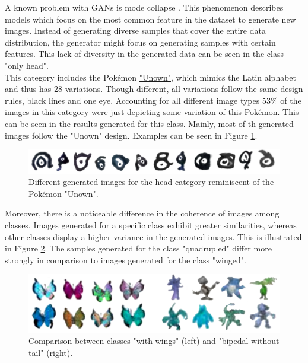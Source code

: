 \documentclass[12pt]{article}
\theoremstyle{plain}
\theoremstyle{definition}
\theoremstyle{remark}
\begin{document}
A known problem with \ac{GAN}s is mode collapse \citep{Zhang2018}. This phenomenon describes models which focus on the most common feature in the dataset to generate new images. Instead of generating diverse samples that cover the entire data distribution, the generator might focus on generating samples with certain features. This lack of diversity in the generated data can be seen in the class "only head".\\
This category includes the Pokémon \href{https://bulbapedia.bulbagarden.net/wiki/Unown_(Pok%C3%A9mon)}{"Unown"}, which mimics the Latin alphabet and thus has 28 variations. Though different, all variations follow the same design rules, black lines and one eye. Accounting for all different image types 53\% of the images in this category were just depicting some variation of this Pokémon. This can be seen in the results generated for this class. Mainly, most of th generated images follow the "Unown" design. Examples can be seen in Figure \ref{fig:Unownvariety}. 

\begin{figure}[H]
	\centering
	\includegraphics[width=0.8\linewidth]{src/Images/unown_examples}
	\caption[Generated images for head]{Different generated images for the head category reminiscent of the Pokémon "Unown".}
	\label{fig:Unownvariety}
\end{figure}


Moreover, there is a noticeable difference in the coherence of images among classes. Images generated for a specific class exhibit greater similarities, whereas other classes display a higher variance in the generated images. This is illustrated in Figure \ref{fig:categorycomparison}. The samples generated for the class "quadrupled" differ more strongly in comparison to images generated for the class "winged".


\begin{figure}[H]
	\centering
	\includegraphics[width=0.9\linewidth]{src/Images/category_comparison}
	\caption[Class Comparison]{Comparison between classes "with wings" (left) and "bipedal without tail" (right).}
	\label{fig:categorycomparison}
\end{figure}
\end{document}
